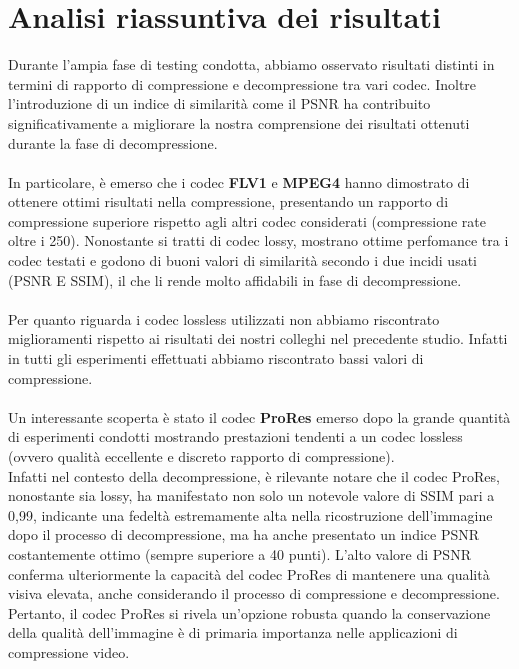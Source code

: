 \clearpage
\section{Analisi riassuntiva dei risultati}
Durante l'ampia fase di testing condotta, abbiamo osservato risultati distinti in termini di rapporto di compressione e decompressione tra vari codec. Inoltre l'introduzione di un indice di similarità come il PSNR  ha contribuito significativamente a migliorare la nostra comprensione dei risultati ottenuti durante la fase di decompressione.
\\
\\
In particolare, è emerso che  i codec \textbf{FLV1} e \textbf{MPEG4} hanno dimostrato di ottenere ottimi risultati nella compressione, presentando un rapporto di compressione superiore rispetto agli altri codec considerati (compressione rate oltre i 250). Nonostante si tratti di codec lossy, mostrano ottime perfomance tra i codec testati e godono di buoni valori di similarità secondo i due incidi usati (PSNR E SSIM), il che li rende molto affidabili in fase di decompressione.
\\
\\
Per quanto riguarda i codec lossless utilizzati non abbiamo riscontrato miglioramenti rispetto ai risultati dei nostri colleghi nel precedente studio. Infatti in tutti gli esperimenti effettuati abbiamo riscontrato bassi valori di compressione.
\\
\\
Un interessante scoperta è stato il codec \textbf{ProRes} emerso dopo la grande quantità di esperimenti condotti mostrando prestazioni tendenti a un codec lossless (ovvero qualità eccellente e discreto rapporto di compressione).
\\
Infatti nel contesto della decompressione, è rilevante notare che il codec ProRes, nonostante sia lossy, ha manifestato non solo un notevole valore di SSIM pari a 0,99, indicante una fedeltà estremamente alta nella ricostruzione dell'immagine dopo il processo di decompressione, ma ha anche presentato un indice PSNR costantemente ottimo (sempre superiore a 40 punti). L'alto valore di PSNR conferma ulteriormente la capacità del codec ProRes di mantenere una qualità visiva elevata, anche considerando il processo di compressione e decompressione. Pertanto, il codec  ProRes si rivela un'opzione robusta quando la conservazione della qualità dell'immagine è di primaria importanza nelle applicazioni di compressione video.


\clearpage
